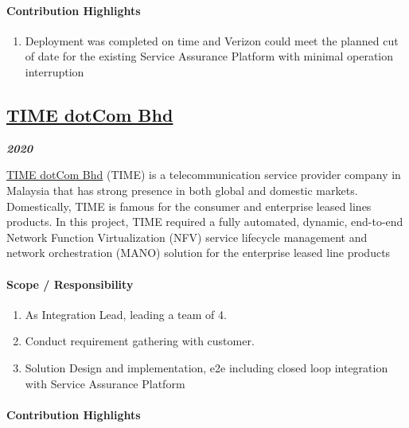 \documentclass[
]{article}
\providecommand{\tightlist}{%
  \setlength{\itemsep}{0pt}\setlength{\parskip}{0pt}}
\begin{document}
\hypertarget{contribution-highlights}{%
\paragraph{Contribution Highlights}\label{contribution-highlights}}

\begin{enumerate}
\def\labelenumi{\arabic{enumi}.}
\tightlist
\item
  Deployment was completed on time and Verizon could meet the planned
  cut of date for the existing Service Assurance Platform with minimal
  operation interruption
\end{enumerate}

\hypertarget{time-dotcom-bhd}{%
\subsection{\texorpdfstring{\href{https://www.time.com.my/}{TIME dotCom
Bhd}}{TIME dotCom Bhd}}\label{time-dotcom-bhd}}

\textbf{\emph{2020}}

\href{https://www.time.com.my/}{TIME dotCom Bhd} (TIME) is a
telecommunication service provider company in Malaysia that has strong
presence in both global and domestic markets. Domestically, TIME is
famous for the consumer and enterprise leased lines products. In this
project, TIME required a fully automated, dynamic, end-to-end Network
Function Virtualization (NFV) service lifecycle management and network
orchestration (MANO) solution for the enterprise leased line products

\hypertarget{scope-responsibility-2}{%
\paragraph{Scope / Responsibility}\label{scope-responsibility-2}}

\begin{enumerate}
\def\labelenumi{\arabic{enumi}.}
\tightlist
\item
  As Integration Lead, leading a team of 4.
\item
  Conduct requirement gathering with customer.
\item
  Solution Design and implementation, e2e including closed loop
  integration with Service Assurance Platform
\end{enumerate}

\hypertarget{contribution-highlights-1}{%
\paragraph{Contribution Highlights}\label{contribution-highlights-1}}
\end{document}
